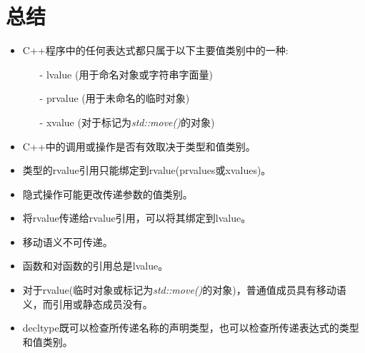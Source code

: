\section{总结}
\begin{itemize}
	\item C++程序中的任何表达式都只属于以下主要值类别中的一种:
	\begin{itemize}
		\item[-] lvalue (用于命名对象或字符串字面量)
		\item[-] prvalue (用于未命名的临时对象)
		\item[-] xvalue (对于标记为\textit{std::move()}的对象)
	\end{itemize}
	\item C++中的调用或操作是否有效取决于类型和值类别。
	\item 类型的rvalue引用只能绑定到rvalue(prvalues或xvalues)。
	\item 隐式操作可能更改传递参数的值类别。
	\item 将rvalue传递给rvalue引用，可以将其绑定到lvalue。
	\item 移动语义不可传递。
	\item 函数和对函数的引用总是lvalue。
	\item 对于rvalue(临时对象或标记为\textit{std::move()}的对象)，普通值成员具有移动语义，而引用或静态成员没有。
	\item decltype既可以检查所传递名称的声明类型，也可以检查所传递表达式的类型和值类别。
\end{itemize}


